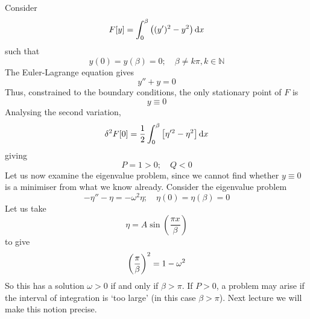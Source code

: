 \begin{example}
	Consider
	\[
		F[y] = \int_0^\beta \qty((y')^2 - y^2)\dd{x}
	\]
	such that
	\[
		y(0) = y(\beta) = 0;\quad \beta \neq k\pi, k \in \mathbb N
	\]
	The Euler-Lagrange equation gives
	\[
		y'' + y = 0
	\]
	Thus, constrained to the boundary conditions, the only stationary point of \( F \) is
	\[
		y \equiv 0
	\]
	Analysing the second variation,
	\[
		\delta^2 F[0] = \frac{1}{2} \int_0^\beta \qty[\eta'^2 - \eta^2] \dd{x}
	\]
	giving
	\[
		P = 1 > 0;\quad Q < 0
	\]
	Let us now examine the eigenvalue problem, since we cannot find whether \( y \equiv 0 \) is a minimiser from what we know already.
	Consider the eigenvalue problem
	\[
		-\eta'' - \eta = -\omega^2 \eta;\quad \eta(0) = \eta(\beta) = 0
	\]
	Let us take
	\[
		\eta = A \sin(\frac{\pi x}{\beta})
	\]
	to give
	\[
		\qty(\frac{\pi}{\beta})^2 = 1 - \omega^2
	\]
	So this has a solution \( \omega > 0 \) if and only if \( \beta > \pi \).
	If \( P > 0 \), a problem may arise if the interval of integration is `too large' (in this case \( \beta > \pi \)).
	Next lecture we will make this notion precise.
\end{example}
